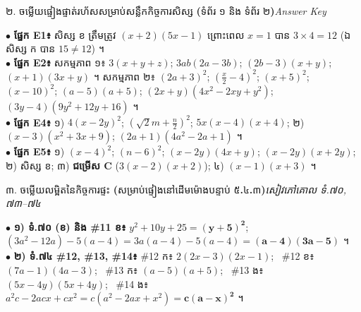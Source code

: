\documentclass[a4paper,10pt]{article}
\newcommand{\en}[1]{{\TimesEn #1}}
\newcommand{\enbf}[1]{{\TimesEn\bfseries #1}}
\newcommand{\secstrip}[2]{%
  \vspace{3pt}%
  \begin{tcolorbox}[
    enhanced, sharp corners, colback=panelgray, colframe=black,
    boxrule=0.8pt, boxsep=0.8pt, top=2pt, bottom=2pt, left=5pt, right=5pt,
    after skip=3pt
  ]
    {\muol\fontsize{8.5pt}{12.2pt}\selectfont #1}\hfill{\fontsize{7.8pt}{10.8pt}\selectfont\textit{#2}}
  \end{tcolorbox}%
}
\begin{document}
\secstrip{២. ចម្លើយផ្ទៀងផ្ទាត់រហ័សសម្រាប់សន្លឹកកិច្ចការសិស្ស \enbf{(}ទំព័រ ១ និង ទំព័រ ២\enbf{)}}{\en{Answer Key}}

\begin{tcolorbox}[
  enhanced, sharp corners, colback=white, colframe=black,
  boxrule=0.8pt, boxsep=2.5pt, top=4pt, bottom=4pt, left=6pt, right=6pt
]
  $\bullet$ \textbf{ផ្នែក \en{E1}៖} សិស្ស ខ ត្រឹមត្រូវ $(x+2)(5x-1)$ ព្រោះពេល $x=1$ បាន $3\times 4 = 12$ (ឯសិស្ស ក បាន $15 \neq 12$) ។\\[2pt]
  $\bullet$ \textbf{ផ្នែក \en{E2}៖} សកម្មភាព ១៖ $3(x+y+z)$; $3ab(2a-3b)$; $(2b-3)(x+y)$; $(x+1)(3x+y)$ ។ សកម្មភាព ២៖ $(2a+3)^2$; $\left(\frac{x}{2}-4\right)^2$; $(x+5)^2$; $(x-10)^2$; $(a-5)(a+5)$; $(2x+y)(4x^2-2xy+y^2)$; $(3y-4)(9y^2+12y+16)$ ។\\[2pt]
  $\bullet$ \textbf{ផ្នែក \en{E4}៖} ១) $4(x-2y)^2$; $\left(\sqrt{2}m+\frac{n}{2}\right)^2$; $5x(x-4)(x+4)$; ២) $(x-3)(x^2+3x+9)$; $(2a+1)(4a^2-2a+1)$ ។\\[2pt]
  $\bullet$ \textbf{ផ្នែក \en{E5}៖} ១) $(x-4)^2$; $(n-6)^2$; $(x-2y)(4x+y)$; $(x-2y)(x+2y)$; ២) សិស្ស ខ; ៣) \textbf{ជម្រើស \en{C}} ($3(x-2)(x+2)$); ៤) $(x-1)(x+3)$ ។
\end{tcolorbox}

\secstrip{៣. ចម្លើយលម្អិតនៃកិច្ចការផ្ទះ \enbf{(}សម្រាប់ផ្ទៀងនៅដើមម៉ោងបន្ទាប់ ៥\enbf{.}៤\enbf{.}៣\enbf{)}}{សៀវភៅគោល ទំ.៧០, ៧៣--៧៤}

\begin{tcolorbox}[
  enhanced, sharp corners, colback=white, colframe=black,
  boxrule=0.8pt, boxsep=2.5pt, top=4pt, bottom=4pt, left=6pt, right=6pt
]
  $\bullet$ \textbf{១) ទំ.៧០ (ខ) និង \en{\#11} ខ៖} $y^2 + 10y + 25 = \mathbf{(y + 5)^2}$; \quad $(3a^2 - 12a) - 5(a - 4) = 3a(a - 4) - 5(a - 4) = \mathbf{(a - 4)(3a - 5)}$ ។\\[2pt]
  $\bullet$ \textbf{២) ទំ.៧៤ \en{\#12, \#13, \#14}៖} \en{\#12} ក៖ $2(2x-3)(2x-1)$; \ \en{\#12} ខ៖ $(7a-1)(4a-3)$; \ \en{\#13} ក៖ $(a-5)(a+5)$; \ \en{\#13} ង៖ $(5x-4y)(5x+4y)$; \ \en{\#14} ង៖ $a^2c - 2acx + cx^2 = c(a^2 - 2ax + x^2) = \mathbf{c(a - x)^2}$ ។
\end{tcolorbox}
\end{document}
